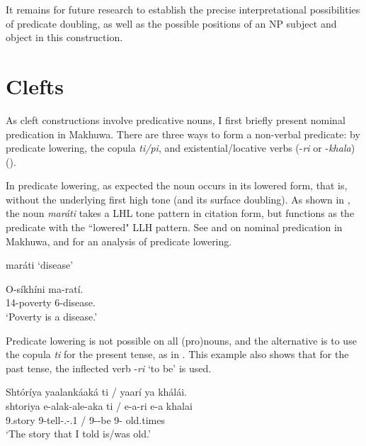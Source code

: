 \documentclass[output=paper]{langscibook}
\begin{document}
It remains for future research to establish the precise interpretational possibilities of predicate doubling, as well as the possible positions of an NP subject and object in this construction. 

\section{Clefts}
\label{bkm:Ref117578839}
As cleft constructions involve predicative nouns, I first briefly present nominal predication in Makhuwa. There are three ways to form a non-verbal predicate: by predicate lowering, the copula \textit{ti/pi}, and existential/locative verbs (\nobreakdash-\textit{ri} or \nobreakdash-\textit{khala}) (\citealt{KujathvanderWal2023}). 

In predicate lowering, as expected the noun occurs in its lowered form, that is, without the underlying first high tone (and its surface doubling). As shown in , the noun \textit{maráti} takes a LHL tone pattern in citation form, but functions as the predicate with the ``lowered" LLH pattern. See \citet[119--125]{vanderWal2009a} and \citet{KujathvanderWal2023} on nominal predication in Makhuwa, and \citet{vanderWal2006} for an analysis of predicate lowering.

\ea
\label{bkm:Ref95813480}
\ea   maráti  
‘disease’

\ex
{
\gll
O-síkhíni  ma{}-ratí.\\
14-poverty  6-disease.\PRL{}\\}
\glt
‘Poverty is a disease.’\\

\z
\z

Predicate lowering is not possible on all (pro)nouns, and the alternative is to use the copula \textit{ti} for the present tense, as in . This example also shows that for the past tense, the inflected verb \nobreakdash-\textit{ri} ‘to be’ is used. 

\ea
\label{bkm:Ref95813996}
Shtóríya yaalankáaká ti / yaarí ya khálái.\\
\gll
shtoriya  e-alak-ale-aka  ti  /  e-a-ri  e-a  khalai\\
9.story  9-tell-\PFV{}.\REL{}-\POSS{}.1\SG{}  \COP {} /  9-\PST{}-be  9-\CONN{}  old.times\\
\glt
‘The story that I told is/was old.’\\
\end{document}

